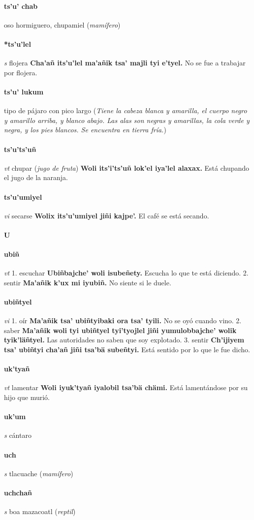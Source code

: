 \documentclass{scrbook}
\newcommand{\entry}[1]{\paragraph{#1}}
\newcommand{\alphaletter}[1]{\addsec{#1}}
\newcommand{\onedefinition}[1]{#1.}
\newcommand{\partofspeech}[1]{\textit{#1}}
\newcommand{\spanishtranslation}[1]{#1}
\newcommand{\clarification}[1]{(\textit{#1})}
\newcommand{\cholexample}[1]{\textbf{#1}}
\newcommand{\exampletranslation}[1]{#1}
\begin{document}
\begin{multicols}{2}
\entry{ts'u' chab}
\spanishtranslation{oso hormiguero, chupamiel}
\clarification{mamífero}

\entry{*ts'u'lel}
\partofspeech{s}
\spanishtranslation{flojera}
\cholexample{Cha'añ its'u'lel ma'añik tsa' majli tyi e'tyel.}
\exampletranslation{No se fue a trabajar por flojera.}

\entry{ts'u' lukum}
\spanishtranslation{tipo de pájaro con pico largo}
\clarification{Tiene la cabeza blanca y amarilla, el cuerpo negro y amarillo arriba, y blanco abajo. Las alas son negras y amarillas, la cola verde y negra, y los pies blancos. Se encuentra en tierra fría.}

\entry{ts'u'ts'uñ}
\partofspeech{vt}
\spanishtranslation{chupar}
\clarification{jugo de fruta}
\cholexample{Woli its'i'ts'uñ lok'el iya'lel alaxax.}
\exampletranslation{Está chupando el jugo de la naranja.}

\entry{ts'u'umiyel}
\partofspeech{vi}
\spanishtranslation{secarse}
\cholexample{Wolix its'u'umiyel jiñi kajpe'.}
\exampletranslation{El café se está secando.}

\entry{U}
\alphaletter{U}

\entry{ubiñ}
\partofspeech{vt}
\onedefinition{1}
\spanishtranslation{escuchar}
\cholexample{Ubiñbajche' woli isubeñety.}
\exampletranslation{Escucha lo que te está diciendo.}
\onedefinition{2}
\spanishtranslation{sentir}
\cholexample{Ma'añik k'ux mi iyubiñ.}
\exampletranslation{No siente si le duele.}

\entry{ubiñtyel}
\partofspeech{vi}
\onedefinition{1}
\spanishtranslation{oír}
\cholexample{Ma'añik tsa' ubiñtyibaki ora tsa' tyili.}
\exampletranslation{No se oyó cuando vino.}
\onedefinition{2}
\spanishtranslation{saber}
\cholexample{Ma'añik woli tyi ubiñtyel tyi'tyojlel jiñi yumulobbajche' wolik tyik'läñtyel.}
\exampletranslation{Las autoridades no saben que soy explotado.}
\onedefinition{3}
\spanishtranslation{sentir}
\cholexample{Ch'ijiyem tsa' ubiñtyi cha'añ jiñi tsa'bä subeñtyi.}
\exampletranslation{Está sentido por lo que le fue dicho.}

\entry{uk'tyañ}
\partofspeech{vt}
\spanishtranslation{lamentar}
\cholexample{Woli iyuk'tyañ iyalobil tsa'bä chämi.}
\exampletranslation{Está lamentándose por su hijo que murió.}

\entry{uk'um}
\partofspeech{s}
\spanishtranslation{cántaro}

\entry{uch}
\partofspeech{s}
\spanishtranslation{tlacuache}
\clarification{mamífero}

\entry{uchchañ}
\partofspeech{s}
\spanishtranslation{boa}
\spanishtranslation{mazacoatl}
\clarification{reptil}


\end{multicols}
\end{document}
